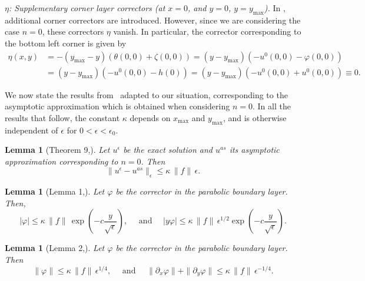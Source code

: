 \documentclass{article}
\newtheorem{lemma}[thm]{Lemma}
\newcommand{\ueps}{u^\epsilon}
\newcommand{\uas}{u^{as}}
\begin{document}
\begin{appendix}
\medskip 
\textit{$\eta$: Supplementary corner layer correctors (at ${x=0}$, and ${y=0}$, ${y=y_{\max}}$).}
In \cite{GieEtAl:13}, additional corner correctors are introduced. However, since we are considering the case $n=0$, these correctors $\eta$ vanish. In particular, the corrector corresponding to the bottom left corner is given by
\begin{equation*}
\begin{aligned}
\eta(x,y) &
= -(y_{\max} - y)\left(\theta(0, 0) + \zeta(0, 0)\right) 
= (y - y_{\max})
\left(-u^0(0,0) - \varphi(0, 0)\right) \\
&=(y - y_{\max})
\left(-u^0(0,0) - h(0)\right)
= (y - y_{\max})
\left(-u^0(0,0) +u^0(0,0)\right)\equiv 0.
\end{aligned}
\end{equation*}

We now state the results from~\cite{GieEtAl:13} adapted to our situation, corresponding to the asymptotic approximation which is obtained when considering $n=0$. In all the results that follow, the constant $\kappa$ depends on $x_{\max}$ and $y_{\max}$, and is otherwise independent of $\epsilon$ for $0<\epsilon<\epsilon_0$.

\begin{lemma}[Theorem 9,\cite{GieEtAl:13}]
\label{Temam:ErrorBound}
Let $\ueps$ be the exact solution and $\uas$ its asymptotic approximation corresponding to $n=0$. Then
\[
\|\ueps - \uas\|_{\epsilon}\leq \kappa \, \|f\| \, \epsilon.
\]
\end{lemma}

\begin{lemma}[Lemma 1,\cite{GieEtAl:13}]\label{Temam:Lemma1}
Let $\varphi$ be the corrector in the parabolic boundary layer. Then,
\begin{equation*}
|\varphi|\leq \kappa \, \|f\| \, \exp(-c \frac{y}{\sqrt{\epsilon}}),\quad \text{ and }\quad
|y\varphi|\leq \kappa \, \|f\| \, \epsilon^{1/2}\exp(-c \frac{y}{\sqrt{\epsilon}}).
\end{equation*}
\end{lemma}

\begin{lemma}[Lemma 2,\cite{GieEtAl:13}]\label{Temam:Lemma2}
Let $\varphi$ be the corrector in the parabolic boundary layer. Then
\[
\|\varphi\|\leq \kappa \, \|f\| \,  \epsilon^{1/4},
\quad \text{ and }\quad
\|\partial_x\varphi\| + \|\partial_y\varphi\| \leq  
\kappa \, \|f\| \, \epsilon^{-1/4}.
\]
\end{lemma}


\end{appendix}
\end{document}
